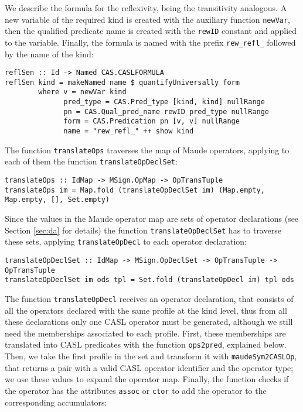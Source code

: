 We describe the formula for the reflexivity, being the transitivity
analogous. A new variable of the required kind is created with
the auxiliary function \verb"newVar", then the qualified predicate
name is created with the \verb"rewID" constant and applied to the
variable. Finally, the formula is named with the prefix \verb"rew_refl_"
followed by the name of the kind:

{\codesize
\begin{verbatim}
reflSen :: Id -> Named CAS.CASLFORMULA
reflSen kind = makeNamed name $ quantifyUniversally form
        where v = newVar kind
              pred_type = CAS.Pred_type [kind, kind] nullRange
              pn = CAS.Qual_pred_name rewID pred_type nullRange
              form = CAS.Predication pn [v, v] nullRange
              name = "rew_refl_" ++ show kind
\end{verbatim}
}

The function \verb"translateOps" traverses the map of Maude operators,
applying to each of them the function \verb"translateOpDeclSet":

{\codesize
\begin{verbatim}
translateOps :: IdMap -> MSign.OpMap -> OpTransTuple
translateOps im = Map.fold (translateOpDeclSet im) (Map.empty, Map.empty, [], Set.empty)
\end{verbatim}
}

Since the values in the Maude operator map are sets of operator declarations
(see Section \ref{sec:da} for details)
the function \verb"translateOpDeclSet" has to traverse these sets, applying
\verb"translateOpDecl" to each operator declaration:

{\codesize
\begin{verbatim}
translateOpDeclSet :: IdMap -> MSign.OpDeclSet -> OpTransTuple -> OpTransTuple
translateOpDeclSet im ods tpl = Set.fold (translateOpDecl im) tpl ods
\end{verbatim}
}

The function \verb"translateOpDecl" receives an operator declaration,
that consists of all the operators declared with the same profile at
the kind level, thus from all these declarations only one CASL operator
must be generated, although we still need the memberships associated
to each profile. First, these memberships are translated into CASL
predicates with the function \verb"ops2pred", explained below.
Then, we take the first profile in the set and transform
it with \verb"maudeSym2CASLOp", that returns a pair with a valid CASL
operator identifier and the operator type; we use these values
to expand the operator map. Finally, the function checks if the operator
has the attributes \texttt{assoc} or \texttt{ctor} to add the
operator to the corresponding accumulators:

